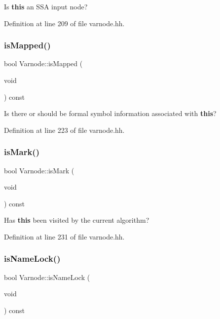Is {\bfseries{this}} an S\+SA input node? 



Definition at line 209 of file varnode.\+hh.

\mbox{\label{class_varnode_a4c53a54e074c85e38f38eb3c2c3ae13d}} 
\subsubsection{\texorpdfstring{isMapped()}{isMapped()}}
{\footnotesize\ttfamily bool Varnode\+::is\+Mapped (\begin{DoxyParamCaption}\item[{void}]{ }\end{DoxyParamCaption}) const\hspace{0.3cm}{\ttfamily [inline]}}



Is there or should be formal symbol information associated with {\bfseries{this}}? 



Definition at line 223 of file varnode.\+hh.

\mbox{\label{class_varnode_a45c802c00e20c46f4d8b15230c5150e0}} 
\subsubsection{\texorpdfstring{isMark()}{isMark()}}
{\footnotesize\ttfamily bool Varnode\+::is\+Mark (\begin{DoxyParamCaption}\item[{void}]{ }\end{DoxyParamCaption}) const\hspace{0.3cm}{\ttfamily [inline]}}



Has {\bfseries{this}} been visited by the current algorithm? 



Definition at line 231 of file varnode.\+hh.

\mbox{\label{class_varnode_ac1b751f0ec33664d4345972da6bfcfe4}} 
\subsubsection{\texorpdfstring{isNameLock()}{isNameLock()}}
{\footnotesize\ttfamily bool Varnode\+::is\+Name\+Lock (\begin{DoxyParamCaption}\item[{void}]{ }\end{DoxyParamCaption}) const\hspace{0.3cm}{\ttfamily [inline]}}



